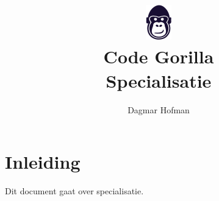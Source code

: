\documentclass{article}
\title{ \includegraphics[scale=1]{gorilla.png} \\ Code Gorilla \\ Specialisatie}
\author{Dagmar Hofman}
\date{}
\begin{document}
	\maketitle
	\newpage
	\tableofcontents
	\newpage
	\section{Inleiding}
	Dit document gaat over specialisatie. \\
	
\end{document}

